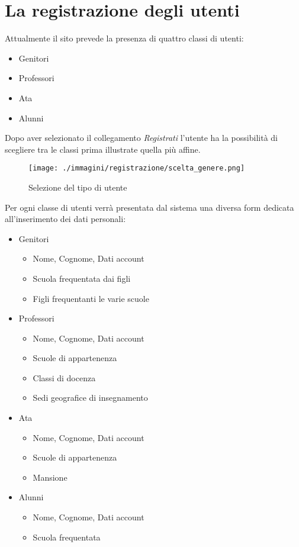 \chapter[Registrazione]{La registrazione degli utenti}

Attualmente il sito prevede la presenza di quattro classi di utenti:

\begin{itemize}
 \item Genitori
\item Professori
\item Ata
\item Alunni
\end{itemize}


Dopo aver selezionato il collegamento \emph{Registrati} l'utente ha la possibilità di scegliere tra le classi prima illustrate quella più affine.

\begin{figure}[H]
 \centering
 \texttt{[image: ./immagini/registrazione/scelta\_genere.png]}
 \caption{Selezione del tipo di utente}
 \label{fig:reg_sel}
\end{figure}
Per ogni classe di utenti verrà presentata dal sistema una diversa form dedicata all'inserimento dei dati personali:
\begin{itemize}
 \item Genitori
\begin{itemize}
 \item Nome, Cognome, Dati account
\item Scuola frequentata dai figli
\item Figli frequentanti le varie scuole
\end{itemize}
\item Professori
\begin{itemize}
 \item Nome, Cognome, Dati account
\item Scuole di appartenenza
\item Classi di docenza
\item Sedi geografice di insegnamento
\end{itemize}
\item Ata
\begin{itemize}
 \item Nome, Cognome, Dati account
\item Scuole di appartenenza
\item Mansione
\end{itemize}
\item Alunni
\begin{itemize}
 \item Nome, Cognome, Dati account
\item Scuola frequentata
\end{itemize}
\end{itemize}


